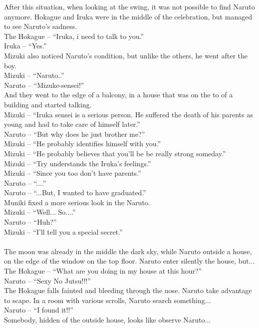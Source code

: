 \documentclass[
10pt,				%
openright,			%
oneside,			%
a5paper,			%
brazil,				%
french,				%
english,			%
sumario=tradicional
]{abntex2}
\begin{document}
After this situation, when looking at the swing, it was not possible to find Naruto anymore. Hokague and Iruka were in the middle of the celebration, but managed to see Naruto's sadness.\\
The Hokague -- \enquote{Iruka, i need to talk to you.}\\
Iruka -- \enquote{Yes.}\\

Mizuki also noticed Naruto's condition, but unlike the others, he went after the boy.\\
Mizuki -- \enquote{Naruto..}\\
Naruto -- \enquote{Mizuke-sensei!}\\

And they went to the edge of a balcony,  in a house that was on the to of a building and started talking.\\
Mizuki -- \enquote{Iruka sensei is a serious person. He suffered the death of his parents  as young and had to take care of himself later.}\\
Naruto -- \enquote{But why does he just brother me?}\\

Mizuki -- \enquote{He probably identifies himself with you.}\\
Mizuki -- \enquote{He probably believes that you'll be be really strong someday.}\\
Mizuki -- \enquote{Try understands the Iruka's feelings.}\\
Mizuki -- \enquote{Since you too don't have parents.}\\
Naruto -- \enquote{....}\\
Naruto -- \enquote{...But, I wanted to have graduated.}\\
Muniki  fixed a more serious  look in the Naruto.\\
Mizuki -- \enquote{Well... So....}\\
Naruto -- \enquote{Huh?}\\
Mizuki -- \enquote{I'll tell you a special secret.}\\\\

The moon  was already in the middle the dark sky, while Naruto outside a house, on the edge of the window on the top floor. Naruto enter silently the house, but... \\
The Hokague -- \enquote{What are you doing in my house at this hour?}\\
Naruto -- \enquote{Sexy No Jutsu!!!}\\
The Hokague falls fainted and bleeding through the nose. Naruto take advantage to scape. In a room with various scrolls, Naruto search something...\\
Naruto -- \enquote{I found it!!}\\
Somebody, hidden of the outside house, looks like observe Naruto...
\end{document}
